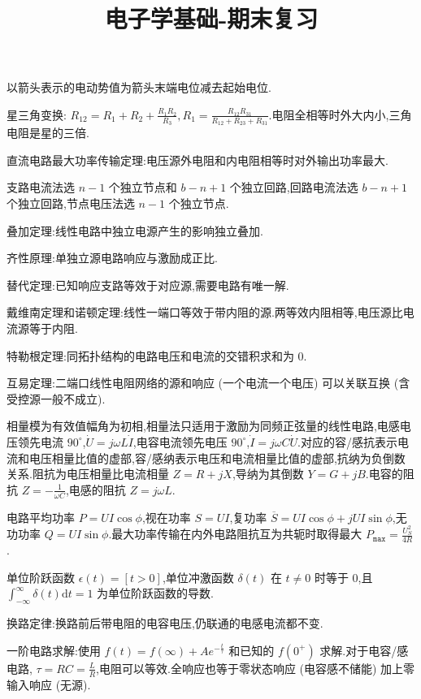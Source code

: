 
\usepackage{../../homeworks_preamble}
\usepackage[margin=5pt]{geometry}
\setlength{\parindent}{0pt}
\title{电子学基础-期末复习}


以箭头表示的电动势值为箭头末端电位减去起始电位.

星三角变换: $R_{12}=R_1+R_2+\frac{R_1R_2}{R_3},R_1=\frac{R_{12}R_{31}}{R_{12}+R_{23}+R_{31}}$.电阻全相等时外大内小,三角电阻是星的三倍.

直流电路最大功率传输定理:电压源外电阻和内电阻相等时对外输出功率最大.

支路电流法选 $n-1$ 个独立节点和 $b-n+1$ 个独立回路,回路电流法选 $b-n+1$ 个独立回路,节点电压法选 $n-1$ 个独立节点.

叠加定理:线性电路中独立电源产生的影响独立叠加.

齐性原理:单独立源电路响应与激励成正比.

替代定理:已知响应支路等效于对应源,需要电路有唯一解.

戴维南定理和诺顿定理:线性一端口等效于带内阻的源.两等效内阻相等,电压源比电流源等于内阻.

特勒根定理:同拓扑结构的电路电压和电流的交错积求和为 $0$.

互易定理:二端口线性电阻网络的源和响应 (一个电流一个电压) 可以关联互换 (含受控源一般不成立).

相量模为有效值幅角为初相,相量法只适用于激励为同频正弦量的线性电路,电感电压领先电流 $90^{\circ}$,$\dot{U}=j\omega L\dot{I}$,电容电流领先电压 $90^{\circ}$,$\dot{I}=j\omega C \dot{U}$.对应的容/感抗表示电流和电压相量比值的虚部,容/感纳表示电压和电流相量比值的虚部,抗纳为负倒数关系.阻抗为电压相量比电流相量 $Z=R+jX$,导纳为其倒数 $Y=G+jB$.电容的阻抗 $Z=-\frac{1}{\omega C}$,电感的阻抗 $Z=j\omega L$.

电路平均功率 $P=UI\cos\phi$,视在功率 $S=UI$,复功率 $\overline{S}=UI\cos\phi+jUI\sin\phi$,无功功率 $Q=UI\sin\phi$.最大功率传输在内外电路阻抗互为共轭时取得最大 $P_{\texttt{max}}=\frac{U_{S}^2}{4R}$.

单位阶跃函数 $\epsilon\left( t \right) =\left[t>0\right]$,单位冲激函数 $\delta\left( t \right)$ 在 $t\ne0$ 时等于 $0$,且 $\int_{-\infty}^{\infty}\delta\left( t \right) \mathrm{d}t=1$ 为单位阶跃函数的导数.

换路定律:换路前后带电阻的电容电压,仍联通的电感电流都不变.

一阶电路求解:使用 $f\left( t \right) =f\left( \infty \right) +Ae^{-\frac{t}{\tau}}$ 和已知的 $f\left( 0^{+} \right) $ 求解.对于电容/感电路, $\tau=RC=\frac{L}{R}$,电阻可以等效.全响应也等于零状态响应 (电容感不储能) 加上零输入响应 (无源).

